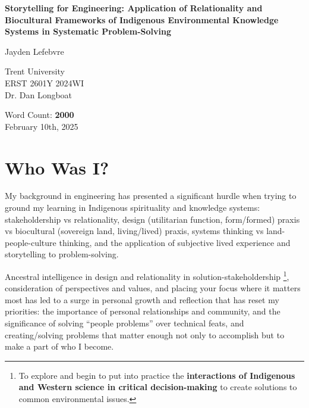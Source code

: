 \documentclass{report}
\begin{document}
\begin{titlepage}
    \begin{center}
        \vspace*{1.2cm}

        \textbf{Storytelling for Engineering: Application of Relationality and Biocultural Frameworks of Indigenous Environmental Knowledge Systems in Systematic Problem-Solving}

        \vspace{1.25cm}

        Jayden Lefebvre\\

        \vspace{5cm}
        
        Trent University\\
        ERST 2601Y 2024WI\\
        Dr. Dan Longboat\\

        \vfill

        Word Count: \textbf{2000}\\
        February 10th, 2025
        
    \end{center}
\end{titlepage}

\clearpage

\section{Who Was I?}

My background in engineering has presented a significant hurdle when trying to ground my learning in Indigenous spirituality and knowledge systems: stakeholdership vs relationality, design (utilitarian function, form/formed) praxis vs biocultural (sovereign land, living/lived) praxis, systems thinking vs land-people-culture thinking, and the application of subjective lived experience and storytelling to problem-solving.

Ancestral intelligence in design and relationality in solution-stakeholdership \footnote{To explore and begin to put into practice the \textbf{interactions of Indigenous and Western science in critical decision-making} to create solutions to common environmental issues.}, consideration of perspectives and values, and placing your focus where it matters most has led to a surge in personal growth and reflection that has reset my priorities: the importance of personal relationships and community, and the significance of solving ``people problems'' over technical feats, and creating/solving problems that matter enough not only to accomplish but to make a part of who I become.
\end{document}
